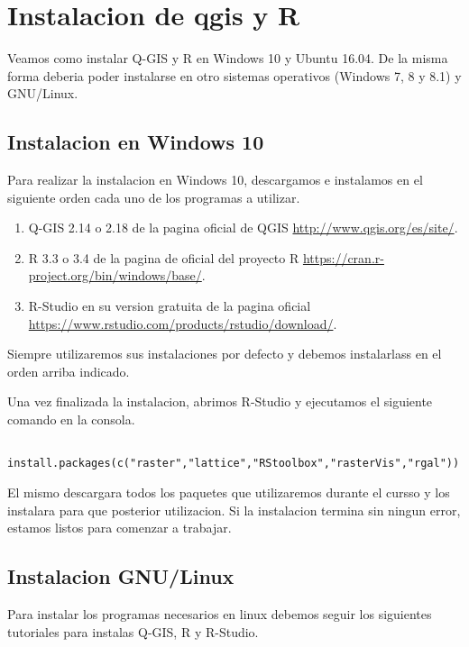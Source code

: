 \chapter{Instalacion de qgis y R}

Veamos como instalar Q-GIS y R en Windows 10 y Ubuntu 16.04. De la misma forma deberia poder instalarse en otro sistemas operativos (Windows 7, 8 y 8.1) y GNU/Linux.

\section{Instalacion en Windows 10}

Para realizar la instalacion en Windows 10, descargamos e instalamos en el siguiente orden cada uno de los programas a utilizar.

\begin{enumerate}
  \item Q-GIS 2.14 o 2.18 de la pagina oficial de QGIS \url{http://www.qgis.org/es/site/}.
  \item R 3.3 o 3.4 de la pagina de oficial del proyecto R \url{https://cran.r-project.org/bin/windows/base/}.
  \item R-Studio en su version gratuita de la pagina oficial \url{https://www.rstudio.com/products/rstudio/download/}.
\end{enumerate}

Siempre utilizaremos sus instalaciones por defecto y debemos instalarlass en el orden arriba indicado.

Una vez finalizada la instalacion, abrimos R-Studio y ejecutamos el siguiente comando en la consola.

\begin{lstlisting}
  install.packages(c("raster","lattice","RStoolbox","rasterVis","rgal"))
\end{lstlisting}

El mismo descargara todos los paquetes que utilizaremos durante el cursso y los instalara para que posterior utilizacion. Si la instalacion termina sin ningun error, estamos listos para comenzar a trabajar.

\section{Instalacion GNU/Linux}

Para instalar los programas necesarios en linux debemos seguir los siguientes tutoriales para instalas Q-GIS, R y R-Studio.

